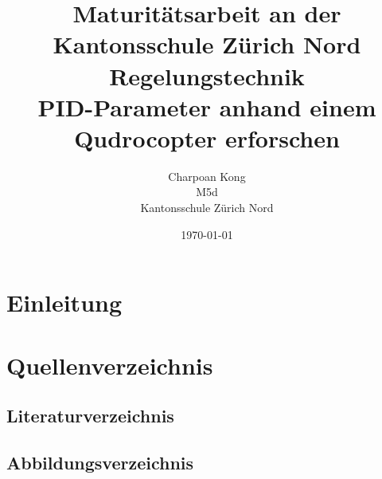 \documentclass[12pt,a4paper, ngerman]{article}
\begin{document}
\title{\large Maturitätsarbeit an der Kantonsschule Zürich Nord \\ \Huge Regelungstechnik \\ \huge PID-Parameter anhand einem Qudrocopter erforschen}
\date{\today}
\author{Charpoan Kong \\ M5d \\ Kantonsschule Zürich Nord}
\maketitle
{}

\newpage
\clearpage
{}
\tableofcontents
\newpage
{}

\section{Einleitung}


\newpage
\section{Quellenverzeichnis}
\subsection{Literaturverzeichnis}
\subsection{Abbildungsverzeichnis}
\end{document}
